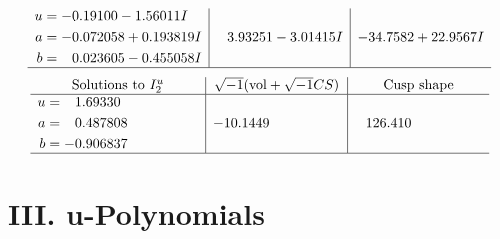 \documentclass[1p]{elsarticle_modified}
\theoremstyle{definition}
\newcommand{\I}{\sqrt{-1}}
\begin{document}
$$\begin{array}{c|c|c}
\begin{aligned}
u &= -0.19100 - 1.56011 I \\
a &= -0.072058 + 0.193819 I \\
b &= \phantom{-}0.023605 - 0.455058 I\end{aligned}
 & \phantom{-}3.93251 - 3.01415 I & -34.7582 + 22.9567 I\\
 \hline 
 \end{array}$$\newpage$$\begin{array}{c|c|c}  
\text{Solutions to }I^u_{2}& \I (\text{vol} + \sqrt{-1}CS) & \text{Cusp shape}\\
 \hline 
\begin{aligned}
u &= \phantom{-}1.69330\phantom{ +0.000000I} \\
a &= \phantom{-}0.487808\phantom{ +0.000000I} \\
b &= -0.906837\phantom{ +0.000000I}\end{aligned}
 & -10.1449\phantom{ +0.000000I} & \phantom{-}126.410\phantom{ +0.000000I}\\
 \hline 
 \end{array}$$\newpage
\newpage\renewcommand{\arraystretch}{1}
\centering \section*{ III. u-Polynomials}
\end{document}
